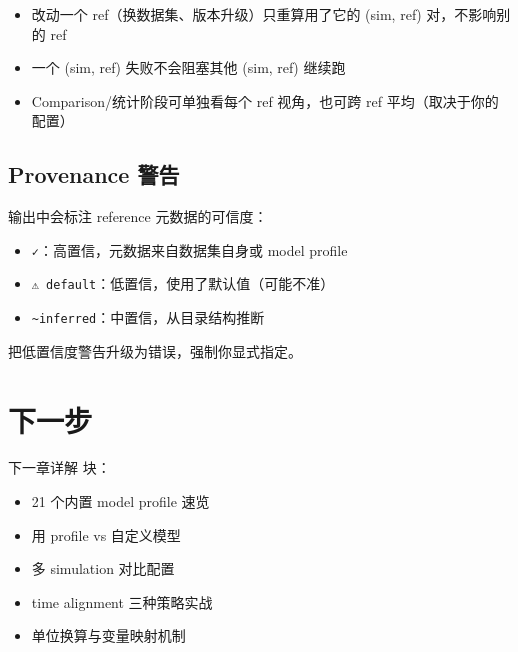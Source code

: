 \begin{itemize}
  \item 改动一个 ref（换数据集、版本升级）只重算用了它的 (sim, ref) 对，不影响别的 ref
  \item 一个 (sim, ref) 失败不会阻塞其他 (sim, ref) 继续跑
  \item Comparison/统计阶段可单独看每个 ref 视角，也可跨 ref 平均（取决于你的  配置）
\end{itemize}


\subsection{Provenance 警告}

 输出中会标注 reference 元数据的可信度：

\begin{itemize}
  \item \texttt{✓}：高置信，元数据来自数据集自身或 model profile
  \item \texttt{⚠ default}：低置信，使用了默认值（可能不准）
  \item \texttt{\textasciitilde inferred}：中置信，从目录结构推断
\end{itemize}

 把低置信度警告升级为错误，强制你显式指定。

\section{下一步}

下一章详解  块：

\begin{itemize}
  \item 21 个内置 model profile 速览
  \item 用 profile vs 自定义模型
  \item 多 simulation 对比配置
  \item time alignment 三种策略实战
  \item 单位换算与变量映射机制
\end{itemize}
